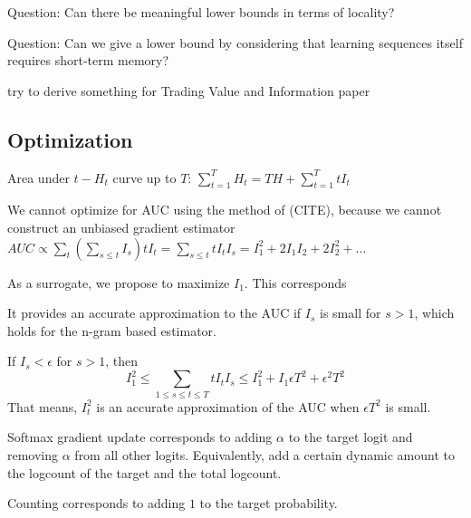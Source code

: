 \documentclass[11pt,letterpaper]{article}
\begin{document}
Question: Can there be meaningful lower bounds in terms of locality?

Question: Can we give a lower bound by considering that learning sequences itself requires short-term memory?

try to derive something for Trading Value and Information paper


\subsection{Optimization}
Area under $t - H_t$ curve up to $T$: $\sum_{t=1}^T H_t = T H + \sum_{t=1}^T t I_t$

We cannot optimize for AUC using the method of (CITE), because we cannot construct an unbiased gradient estimator
$AUC \propto \sum_{t} (\sum_{s \leq t} I_s) tI_t = \sum_{s \leq t}  tI_t I_s = I_1^2 + 2 I_1 I_2 + 2 I_2^2 + \dots$



As a surrogate, we propose to maximize $I_1$.
This corresponds

It provides an accurate approximation to the AUC if $I_s$ is small for $s > 1$, which holds for the n-gram based estimator.

If $I_s < \epsilon$ for $s > 1$, then 
\begin{equation}
	I_1^2 \leq \sum_{1\leq s \leq t \leq T}  tI_t I_s \leq I_1^2 + I_1 \epsilon T^2 + \epsilon^2 T^2
\end{equation}
That means, $I_t^2$ is an accurate approximation of the AUC when $\epsilon T^2$ is small.


Softmax gradient update corresponds to adding $\alpha$ to the target logit and removing $\alpha$ from all other logits.
Equivalently, add a certain dynamic amount to the logcount of the target and the total logcount.



Counting corresponds to adding $1$ to the target probability. 







\end{document}
